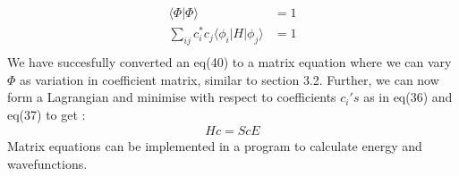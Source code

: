 \documentclass[11pt]{article}   	%
\begin{document}
	\begin{equation}
	\begin{split}
		\langle\Phi|\Phi\rangle&=1\\
		\sum_{ij}c_i^*c_j\langle\phi_i|H|\phi_j\rangle&=1\\
	\end{split}
	\end{equation}	
	We have succesfully converted an eq(40) to a  matrix equation where we can vary $\Phi$ as variation 
	in coefficient matrix, similar to section 3.2. Further, we can now form a Lagrangian and 
	minimise with respect to coefficients $c_i's$ as in eq(36) and eq(37) to get :
	\begin{equation}
	\begin{split}
		Hc=ScE
	\end{split}
	\end{equation}
	 Matrix equations can be implemented in a program to calculate 
	energy and wavefunctions. 
\end{document}
